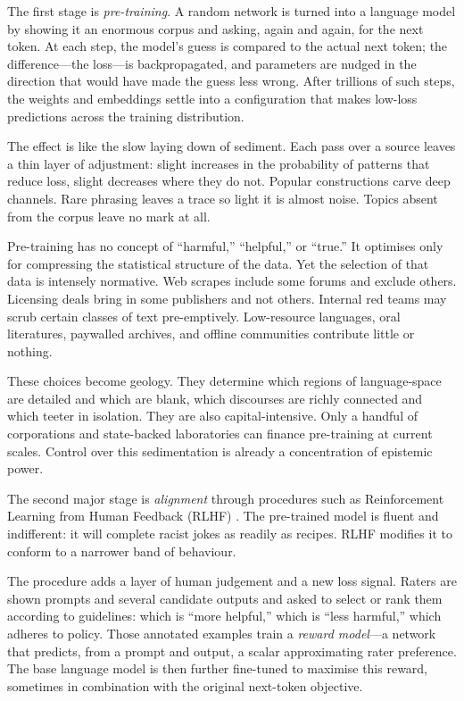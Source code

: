 \documentclass[12pt,a4paper]{article}
\begin{document}
The first stage is \emph{pre-training}. A random network is turned into a language model by showing it an enormous corpus and asking, again and again, for the next token. At each step, the model's guess is compared to the actual next token; the difference---the loss---is backpropagated, and parameters are nudged in the direction that would have made the guess less wrong. After trillions of such steps, the weights and embeddings settle into a configuration that makes low-loss predictions across the training distribution.

The effect is like the slow laying down of sediment. Each pass over a source leaves a thin layer of adjustment: slight increases in the probability of patterns that reduce loss, slight decreases where they do not. Popular constructions carve deep channels. Rare phrasing leaves a trace so light it is almost noise. Topics absent from the corpus leave no mark at all.

Pre-training has no concept of ``harmful,'' ``helpful,'' or ``true.'' It optimises only for compressing the statistical structure of the data. Yet the selection of that data is intensely normative. Web scrapes include some forums and exclude others. Licensing deals bring in some publishers and not others. Internal red teams may scrub certain classes of text pre-emptively. Low-resource languages, oral literatures, paywalled archives, and offline communities contribute little or nothing.

These choices become geology. They determine which regions of language-space are detailed and which are blank, which discourses are richly connected and which teeter in isolation. They are also capital-intensive. Only a handful of corporations and state-backed laboratories can finance pre-training at current scales. Control over this sedimentation is already a concentration of epistemic power.

The second major stage is \emph{alignment} through procedures such as Reinforcement Learning from Human Feedback (RLHF) \cite{gabriel2020artificial,liang2022holistic}. The pre-trained model is fluent and indifferent: it will complete racist jokes as readily as recipes. RLHF modifies it to conform to a narrower band of behaviour.

The procedure adds a layer of human judgement and a new loss signal. Raters are shown prompts and several candidate outputs and asked to select or rank them according to guidelines: which is ``more helpful,'' which is ``less harmful,'' which adheres to policy. Those annotated examples train a \emph{reward model}---a network that predicts, from a prompt and output, a scalar approximating rater preference. The base language model is then further fine-tuned to maximise this reward, sometimes in combination with the original next-token objective.
\end{document}
